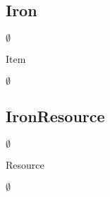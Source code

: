 \subsection{Iron}
\begin{class-template-responsibility}

\end{class-template-responsibility}
\begin{class-template-interface}
$\emptyset$
\end{class-template-interface}
\begin{class-template-baseclass}
Item
\end{class-template-baseclass}
\begin{class-template-attribute}
\item[] $\emptyset$
\end{class-template-attribute}
\begin{class-template-method}
\end{class-template-method}


\subsection{IronResource}
\begin{class-template-responsibility}

\end{class-template-responsibility}
\begin{class-template-interface}
$\emptyset$
\end{class-template-interface}
\begin{class-template-baseclass}
Resource
\end{class-template-baseclass}
\begin{class-template-attribute}
\item[] $\emptyset$
\end{class-template-attribute}
\begin{class-template-method}
\end{class-template-method}


